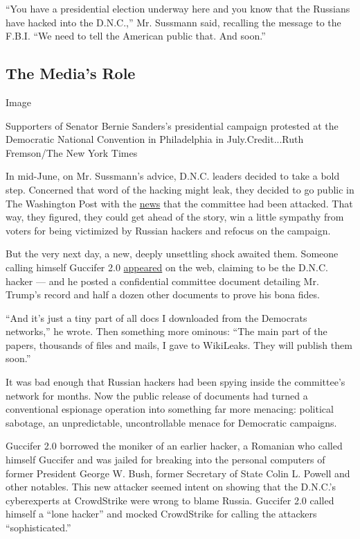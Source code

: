 ``You have a presidential election underway here and you know that the
Russians have hacked into the D.N.C.,'' Mr. Sussmann said, recalling the
message to the F.B.I. ``We need to tell the American public that. And
soon.''

\hypertarget{the-medias-role}{%
\subsection{The Media's Role}\label{the-medias-role}}

Image

Supporters of Senator Bernie Sanders's presidential campaign protested
at the Democratic National Convention in Philadelphia in
July.Credit...Ruth Fremson/The New York Times

In mid-June, on Mr. Sussmann's advice, D.N.C. leaders decided to take a
bold step. Concerned that word of the hacking might leak, they decided
to go public in The Washington Post with the
\href{https://www.washingtonpost.com/world/national-security/russian-government-hackers-penetrated-dnc-stole-opposition-research-on-trump/2016/06/14/cf006cb4-316e-11e6-8ff7-7b6c1998b7a0_story.html}{news}
that the committee had been attacked. That way, they figured, they could
get ahead of the story, win a little sympathy from voters for being
victimized by Russian hackers and refocus on the campaign.

But the very next day, a new, deeply unsettling shock awaited them.
Someone calling himself Guccifer 2.0
\href{https://guccifer2.wordpress.com/2016/06/15/dnc/}{appeared} on the
web, claiming to be the D.N.C. hacker --- and he posted a confidential
committee document detailing Mr. Trump's record and half a dozen other
documents to prove his bona fides.

``And it's just a tiny part of all docs I downloaded from the Democrats
networks,'' he wrote. Then something more ominous: ``The main part of
the papers, thousands of files and mails, I gave to WikiLeaks. They will
publish them soon.''

It was bad enough that Russian hackers had been spying inside the
committee's network for months. Now the public release of documents had
turned a conventional espionage operation into something far more
menacing: political sabotage, an unpredictable, uncontrollable menace
for Democratic campaigns.

Guccifer 2.0 borrowed the moniker of an earlier hacker, a Romanian who
called himself Guccifer and was jailed for breaking into the personal
computers of former President George W. Bush, former Secretary of State
Colin L. Powell and other notables. This new attacker seemed intent on
showing that the D.N.C.'s cyberexperts at CrowdStrike were wrong to
blame Russia. Guccifer 2.0 called himself a ``lone hacker'' and mocked
CrowdStrike for calling the attackers ``sophisticated.''

